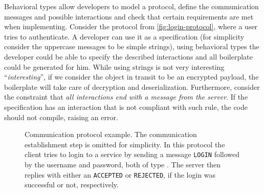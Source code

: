 Behavioral types allow developers to model a protocol,
define the communication messages and possible interactions and
check that certain requirements are met when implementing.
Consider the protocol from \autoref{fig:login-protocol},
where a user tries to authenticate.
A developer can use it as a specification
(for simplicity consider the uppercase messages to be simple strings),
using behavioral types the developer could be able to specify the described interactions and all boilerplate could be generated for him.
While using strings is not very interesting “\emph{interesting}”,
if we consider the object in transit to be an encrypted payload, the boilerplate will take care of decryption and deserialization.
Furthermore, consider the constraint that \emph{all interactions end with a message from the server}.
If the specification has an interaction that is not compliant with such rule,
the code should not compile, raising an error.

\begin{figure}
    \centering
    \caption{
        Communication protocol example. The communication establishment step is omitted for simplicity.
        In this protocol the client tries to login to a service by sending a message
        \texttt{LOGIN} followed by the username and password, both of type .
        The server then replies with either an \texttt{ACCEPTED} or \texttt{REJECTED}, if the login was successful or not, respectively.
    }
    \label{fig:login-protocol}
\end{figure}

